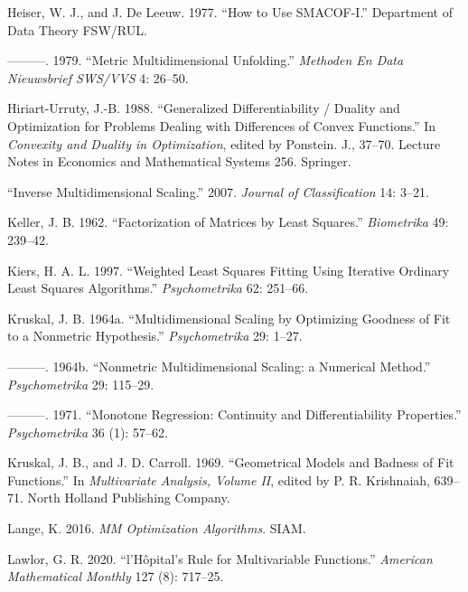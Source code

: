 \documentclass[
  12pt,
  letterpaper,
  DIV=11,
  numbers=noendperiod]{scrreprt}
\newlength{\cslhangindent}
\newenvironment{CSLReferences}[2] %
 {\begin{list}{}{%
  \setlength{\itemindent}{0pt}
  \setlength{\leftmargin}{0pt}
  \setlength{\parsep}{0pt}
  \ifodd #1
   \setlength{\leftmargin}{\cslhangindent}
   \setlength{\itemindent}{-1\cslhangindent}
  \fi
  \setlength{\itemsep}{#2\baselineskip}}}
 {\end{list}}
\theoremstyle{remark}
\begin{document}
\begin{CSLReferences}{1}{0}
Heiser, W. J., and J. De Leeuw. 1977. {``How to Use {SMACOF-I}.''}
Department of Data Theory FSW/RUL.

---------. 1979. {``Metric Multidimensional Unfolding.''} \emph{Methoden
En Data Nieuwsbrief SWS/VVS} 4: 26--50.

Hiriart-Urruty, J.-B. 1988. {``Generalized Differentiability / Duality
and Optimization for Problems Dealing with Differences of Convex
Functions.''} In \emph{Convexity and Duality in Optimization}, edited by
Ponstein. J., 37--70. Lecture Notes in Economics and Mathematical
Systems 256. Springer.

{``{Inverse Multidimensional Scaling}.''} 2007. \emph{Journal of
Classification} 14: 3--21.

Keller, J. B. 1962. {``{Factorization of Matrices by Least Squares}.''}
\emph{Biometrika} 49: 239--42.

Kiers, H. A. L. 1997. {``{Weighted Least Squares Fitting Using Iterative
Ordinary Least Squares Algorithms}.''} \emph{Psychometrika} 62: 251--66.

Kruskal, J. B. 1964a. {``{Multidimensional Scaling by Optimizing
Goodness of Fit to a Nonmetric Hypothesis}.''} \emph{Psychometrika} 29:
1--27.

---------. 1964b. {``{Nonmetric Multidimensional Scaling: a Numerical
Method}.''} \emph{Psychometrika} 29: 115--29.

---------. 1971. {``{Monotone Regression: Continuity and
Differentiability Properties}.''} \emph{Psychometrika} 36 (1): 57--62.

Kruskal, J. B., and J. D. Carroll. 1969. {``{Geometrical Models and
Badness of Fit Functions}.''} In \emph{Multivariate Analysis, Volume
II}, edited by P. R. Krishnaiah, 639--71. North Holland Publishing
Company.

Lange, K. 2016. \emph{MM Optimization Algorithms}. SIAM.

Lawlor, G. R. 2020. {``{l'H{ô}pital's Rule for Multivariable
Functions}.''} \emph{American Mathematical Monthly} 127 (8): 717--25.


\end{CSLReferences}
\end{document}
